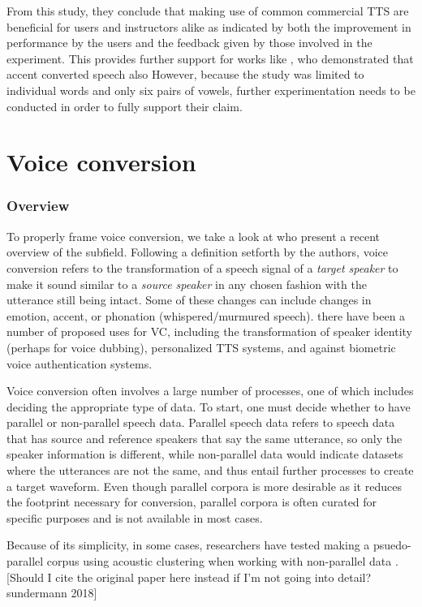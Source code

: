 \documentclass
[
    a4paper,
    twoside,
    12pt
]
{report}
\begin{document}
From this study, they conclude that making use of common commercial TTS
are beneficial for users and instructors alike as indicated by both the
improvement in performance by the users and the feedback given by those
involved in the experiment. This provides further support for works like
\parencite{felps2009}, who demonstrated that accent converted speech
also However, because the study was limited to individual words and only
six pairs of vowels, further experimentation needs to be conducted in
order to fully support their claim.

\section{Voice conversion}\label{voice-conversion}

\subsubsection*{Overview}

To properly frame voice conversion, we take a look at
\textcite{mohammadi2017} who present a recent overview of the subfield.
Following a definition setforth by the authors, voice conversion refers
to the transformation of a speech signal of a \emph{target speaker} to
make it sound similar to a \emph{source speaker} in any chosen fashion
with the utterance still being intact. Some of these changes can include
changes in emotion, accent, or phonation (whispered/murmured speech).
there have been a number of proposed uses for VC, including the
transformation of speaker identity (perhaps for voice dubbing),
personalized TTS systems, and against biometric voice authentication
systems.

Voice conversion often involves a large number of processes, one of
which includes deciding the appropriate type of data. To start, one must
decide whether to have parallel or non-parallel speech data. Parallel
speech data refers to speech data that has source and reference speakers
that say the same utterance, so only the speaker information is
different, while non-parallel data would indicate datasets where the
utterances are not the same, and thus entail further processes to create
a target waveform. Even though parallel corpora is more desirable as it
reduces the footprint necessary for conversion, parallel corpora is
often curated for specific purposes and is not available in most cases.

Because of its simplicity, in some cases, researchers have tested making
a psuedo-parallel corpus using acoustic clustering when working with
non-parallel data \parencite{lorenzo-trueba2018}. {[}Should I cite the
original paper here instead if I'm not going into detail? sundermann
2018{]}
\end{document}
